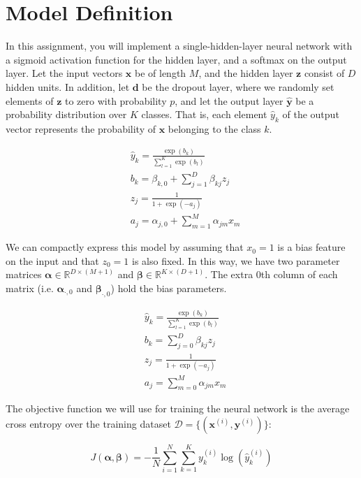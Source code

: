 \documentclass[11pt,addpoints,answers]{exam}
\newcommand{\Dc}{\mathcal{D}}
\newcommand{\Rb}{\mathbb{R}}
\newcommand{\dv}{\mathbf{d}}
\newcommand{\xv}{\mathbf{x}}
\newcommand{\yv}{\mathbf{y}}
\newcommand{\zv}{\mathbf{z}}
\newcommand{\alphav     }{\boldsymbol \alpha     }
\newcommand{\betav      }{\boldsymbol \beta      }
\begin{document}
\section{Model Definition}

In this assignment, you will implement a single-hidden-layer neural network with a sigmoid activation function for the hidden layer, and a softmax on the output layer. Let the input vectors $\xv$ be of length $M$, and the hidden layer $\zv$ consist of $D$ hidden units. In addition, let $\dv$ be the dropout layer, where we randomly set elements of $\zv$ to zero with probability $p$, and let the output layer $\hat{\yv}$ be a probability distribution over $K$ classes. That is, each element $\hat{y}_k$ of the output vector represents the probability of $\xv$ belonging to the class $k$.

\begin{align*}
&  \hat{y}_k = \frac{\exp(b_k)}{\sum_{l=1}^K \exp(b_l)}
\\
& b_k =  \beta_{k,0} + \sum_{j=1}^D \beta_{kj} z_j
\\
& z_j = \frac{1}{1+\exp(-a_j)}
\\
& a_j = \alpha_{j,0} + \sum_{m=1}^M \alpha_{jm} x_m
\end{align*}

We can compactly express this model by assuming that $x_0=1$ is a bias feature on the input and that $z_0=1$ is also fixed. In this way, we have two parameter matrices $\alphav \in \Rb^{D \times (M+1)}$ and $\betav \in \Rb^{K \times (D+1)}$. The extra $0$th column of each matrix (i.e. $\alphav_{\cdot,0}$ and $\betav_{\cdot,0}$) hold the bias parameters.

\begin{align*}
&  \hat{y}_k = \frac{\exp(b_k)}{\sum_{l=1}^K \exp(b_l)}
\\
& b_k =  \sum_{j=0}^D \beta_{kj} z_j
\\
& z_j = \frac{1}{1+\exp(-a_j)}
\\
& a_j = \sum_{m=0}^M \alpha_{jm} x_m
\end{align*}

The objective function we will use for training the neural network is the average cross entropy over the training dataset $\Dc = \{ (\xv^{(i)}, \yv^{(i)}) \}$:

\begin{equation}
\label{eq:celoss}
J(\alphav, \betav)= - \frac{1}{N} \sum_{i=1}^N \sum_{k=1}^{K} y_k^{(i)} \log (\hat{y}^{(i)}_k)
\end{equation}
\end{document}
